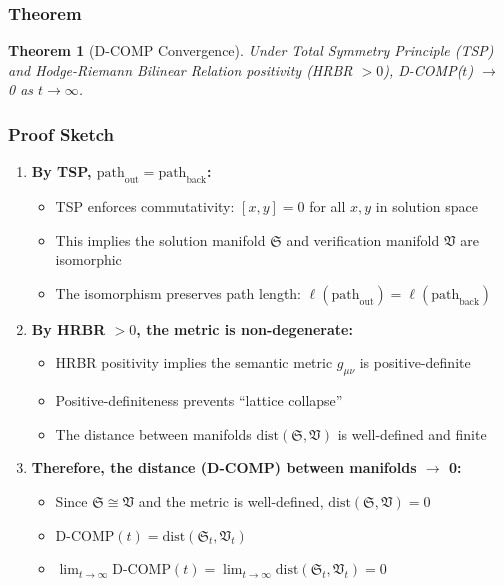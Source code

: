 \documentclass[11pt, letterpaper]{article}
\newtheorem{theorem}{Theorem}[section]
\begin{document}
\subsubsection{Theorem}

\begin{theorem}[D-COMP Convergence]
Under Total Symmetry Principle (TSP) and Hodge-Riemann Bilinear Relation positivity (HRBR $> 0$), D-COMP($t$) $\to$ 0 as $t \to \infty$.
\end{theorem}

\subsubsection{Proof Sketch}

\begin{enumerate}
    \item \textbf{By TSP, $\text{path}_{\text{out}} = \text{path}_{\text{back}}$:}
    \begin{itemize}
        \item TSP enforces commutativity: $[x, y] = 0$ for all $x, y$ in solution space
        \item This implies the solution manifold $\mathfrak{S}$ and verification manifold $\mathfrak{V}$ are isomorphic
        \item The isomorphism preserves path length: $\ell(\text{path}_{\text{out}}) = \ell(\text{path}_{\text{back}})$
    \end{itemize}
    
    \item \textbf{By HRBR $> 0$, the metric is non-degenerate:}
    \begin{itemize}
        \item HRBR positivity implies the semantic metric $g_{\mu\nu}$ is positive-definite
        \item Positive-definiteness prevents ``lattice collapse''
        \item The distance between manifolds $\text{dist}(\mathfrak{S}, \mathfrak{V})$ is well-defined and finite
    \end{itemize}
    
    \item \textbf{Therefore, the distance (D-COMP) between manifolds $\to$ 0:}
    \begin{itemize}
        \item Since $\mathfrak{S} \cong \mathfrak{V}$ and the metric is well-defined, $\text{dist}(\mathfrak{S}, \mathfrak{V}) = 0$
        \item $\text{D-COMP}(t) = \text{dist}(\mathfrak{S}_t, \mathfrak{V}_t)$
        \item $\lim_{t \rightarrow \infty} \text{D-COMP}(t) = \lim_{t \rightarrow \infty} \text{dist}(\mathfrak{S}_t, \mathfrak{V}_t) = 0$
    \end{itemize}
\end{enumerate}
\end{document}

